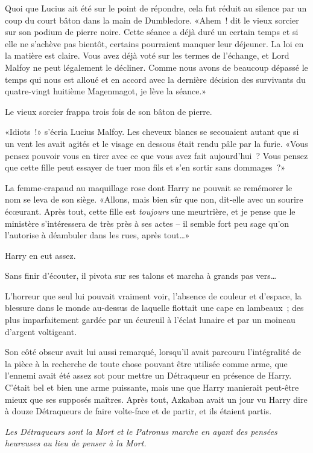 Quoi que Lucius ait été sur le point de répondre, cela fut réduit au silence par un coup du court bâton dans la main de Dumbledore. «Ahem~! dit le vieux sorcier sur son podium de pierre noire. Cette séance a déjà duré un certain temps et si elle ne s'achève pas bientôt, certains pourraient manquer leur déjeuner. La loi en la matière est claire. Vous avez déjà voté sur les termes de l'échange, et Lord Malfoy ne peut légalement le décliner. Comme nous avons de beaucoup dépassé le temps qui nous est alloué et en accord avec la dernière décision des survivants du quatre-vingt huitième Magenmagot, je lève la séance.»

Le vieux sorcier frappa trois fois de son bâton de pierre.

«Idiots~!» s'écria Lucius Malfoy. Les cheveux blancs se secouaient autant que si un vent les avait agités et le visage en dessous était rendu pâle par la furie. «Vous pensez pouvoir vous en tirer avec ce que vous avez fait aujourd'hui~? Vous pensez que cette fille peut essayer de tuer mon fils et s'en sortir sans dommages~?»

La femme-crapaud au maquillage rose dont Harry ne pouvait se remémorer le nom se leva de son siège. «Allons, mais bien sûr que non, dit-elle avec un sourire écœurant. Après tout, cette fille est \emph{toujours} une meurtrière, et je pense que le ministère s'intéressera de très près à ses actes -- il semble fort peu sage qu'on l'autorise à déambuler dans les rues, après tout…»

Harry en eut assez.

Sans finir d'écouter, il pivota sur ses talons et marcha à grands pas vers…

L'horreur que seul lui pouvait vraiment voir, l'absence de couleur et d'espace, la blessure dans le monde au-dessus de laquelle flottait une cape en lambeaux~; des plus imparfaitement gardée par un écureuil à l'éclat lunaire et par un moineau d'argent voltigeant.

Son côté obscur avait lui aussi remarqué, lorsqu'il avait parcouru l'intégralité de la pièce à la recherche de toute chose pouvant être utilisée comme arme, que l'ennemi avait été assez sot pour mettre un Détraqueur en présence de Harry. C'était bel et bien une arme puissante, mais une que Harry manierait peut-être mieux que ses supposés maîtres. Après tout, Azkaban avait un jour vu Harry dire à douze Détraqueurs de faire volte-face et de partir, et ils étaient partis.

\emph{Les Détraqueurs sont la Mort et le Patronus marche en ayant des pensées heureuses au lieu de penser à la Mort.}

